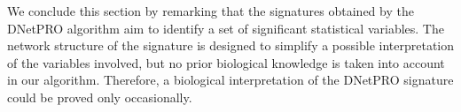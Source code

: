 \documentclass{standalone}
\begin{document}
We conclude this section by remarking that the signatures obtained by the DNetPRO algorithm aim to identify a set of significant statistical variables.
The network structure of the signature is designed to simplify a possible interpretation of the variables involved, but no prior biological knowledge is taken into account in our algorithm.
Therefore, a biological interpretation of the DNetPRO signature could be proved only occasionally.
\end{document}
